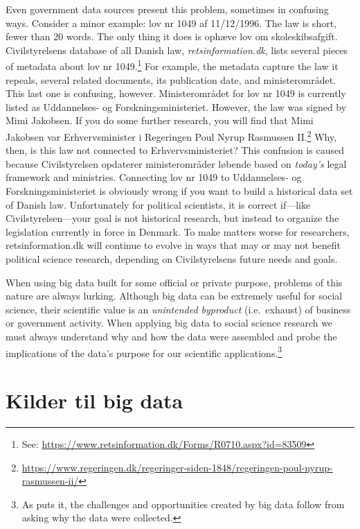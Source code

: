 \documentclass[12pt,]{article}
\begin{document}
Even government data sources present this problem, sometimes in
confusing ways. Consider a minor example: lov nr 1049 af 11/12/1996. The
law is short, fewer than 20 words. The only thing it does is ophæve lov
om skoleskibsafgift. Civilstyrelsens database of all Danish law,
\emph{retsinformation.dk}, lists several pieces of metadata about lov nr
1049.\footnote{See:
  \url{https://www.retsinformation.dk/Forms/R0710.aspx?id=83509}} For
example, the metadata capture the law it repeals, several related
documents, its publication date, and ministerområdet. This last one is
confusing, however. Ministerområdet for lov nr 1049 is currently listed
as Uddannelses- og Forskningsministeriet. However, the law was signed by
Mimi Jakobsen. If you do some further research, you will find that Mimi
Jakobsen var Erhvervsminister i Regeringen Poul Nyrup Rasmussen
II.\footnote{\url{https://www.regeringen.dk/regeringer-siden-1848/regeringen-poul-nyrup-rasmussen-ii/}}
Why, then, is this law not connected to Erhvervsministeriet? This
confusion is caused because Civilstyrelsen opdaterer ministerområder
løbende based on \emph{today's} legal framework and ministries.
Connecting lov nr 1049 to Uddannelses- og Forskningsministeriet is
obviously wrong if you want to build a historical data set of Danish
law. Unfortunately for political scientists, it is correct if---like
Civilstyrelsen---your goal is not historical research, but instead to
organize the legislation currently in force in Denmark. To make matters
worse for researchers, retsinformation.dk will continue to evolve in
ways that may or may not benefit political science research, depending
on Civilstyrelsens future needs and goals.

When using big data built for some official or private purpose, problems
of this nature are always lurking. Although big data can be extremely
useful for social science, their scientific value is an \emph{unintended
byproduct} (i.e.~exhaust) of business or government activity. When
applying big data to social science research we must always understand
why and how the data were assembled and probe the implications of the
data's purpose for our scientific applications.\footnote{As
  \citet{salganik17} puts it, the challenges and opportunities created
  by big data follow from asking why the data were collected.}

\hypertarget{kilder-til-big-data}{%
\section{Kilder til big data}\label{kilder-til-big-data}}
\end{document}
